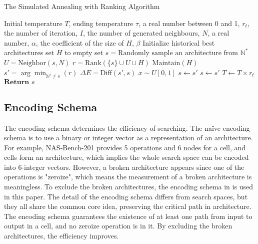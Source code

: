 \documentclass[sigconf]{acmart}
\begin{document}
    \begin{algorithm}[h]
        \caption{The Simulated Annealing with Ranking Algorithm}\label{alg:SA}
        \begin{algorithmic}[1]
            \Parameter Initial temperature $T$, ending temperature $\tau$, a real number between 0 and 1, $r_t$, the number of iteration, $I$, the number of generated neighbours, $N$, a real number, $\alpha$, the coefficient of the size of $H$, $\beta$
            \State Initialize historical best architectures set $H$ to empty set
            \State $s=\text{Randomly sample an architecture from }\mathbb N^*$
                    \State $U = \text{Neighbor}(s, N)$
                    \State $r=\text{Rank}(\{s\}\cup U\cup H)$
                    \State $\text{Maintain}(H)$
                    \State $s'=\arg\min_{\mathbb N^i\neq s}(r)$
                    \State $\Delta E=\text{Diff}(s', s)$
                    \State $x\sim U[0,1]$
                        \State $s\leftarrow s'$
                            \State $s\leftarrow s'$
                    \EndIf
                \EndFor
                \State $T\leftarrow T\times r_t$
            \EndWhile
            \State $\textbf{Return }s$ 
        \end{algorithmic}
    \end{algorithm}

    \subsection{Encoding Schema}

    The encoding schema determines the efficiency of searching. The naïve encoding 
    schema is to use a binary or integer vector as a representation of an architecture. 
    For example, NAS-Bench-201 provides 5 operations and 6 nodes for a cell, 
    and cells form an architecture, which implies the whole search space can be 
    encoded into 6-integer vectors. However, a broken architecture appears since 
    one of the operations is "zeroize", which means the measurement of a broken 
    architecture is meaningless. To exclude the broken architectures, the encoding 
    schema in \cite{10092788} is used in this paper. The detail of the encoding 
    schema differs from search spaces, but they all share the common core idea, 
    preserving the critical path in architecture. The encoding schema guarantees 
    the existence of at least one path from input to output in a cell, and no 
    zeroize operation is in it. By excluding the broken architectures, the efficiency 
    improves. 
\end{document}

